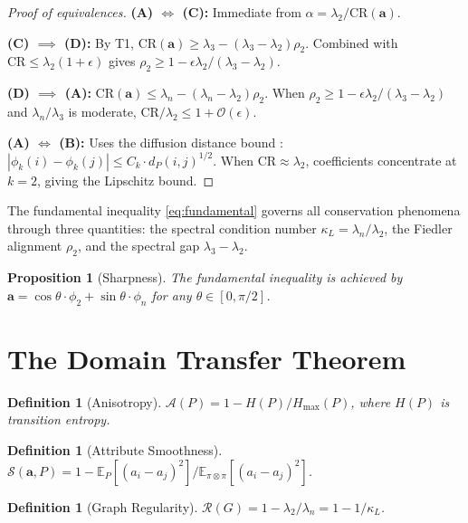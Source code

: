 \documentclass[12pt,letterpaper]{article}
\newtheorem{proposition}[theorem]{Proposition}
\newtheorem{definition}[theorem]{Definition}
\newcommand{\E}{\mathbb{E}}
\newcommand{\bfa}{\mathbf{a}}
\newcommand{\CR}{\mathrm{CR}}
\newcommand{\cA}{\mathcal{A}}
\newcommand{\cS}{\mathcal{S}}
\newcommand{\cR}{\mathcal{R}}
\newcommand{\cO}{\mathcal{O}}
\begin{document}
\begin{proof}[Proof of equivalences]
\textbf{(A) $\iff$ (C):} Immediate from $\alpha = \lambda_2/\CR(\bfa)$.

\textbf{(C) $\implies$ (D):} By T1, $\CR(\bfa) \geq \lambda_3 - (\lambda_3 - \lambda_2)\rho_2$. Combined with $\CR \leq \lambda_2(1+\epsilon)$ gives $\rho_2 \geq 1 - \epsilon\lambda_2/(\lambda_3 - \lambda_2)$.

\textbf{(D) $\implies$ (A):} $\CR(\bfa) \leq \lambda_n - (\lambda_n - \lambda_2)\rho_2$. When $\rho_2 \geq 1 - \epsilon\lambda_2/(\lambda_3 - \lambda_2)$ and $\lambda_n/\lambda_3$ is moderate, $\CR/\lambda_2 \leq 1 + \cO(\epsilon)$.

\textbf{(A) $\iff$ (B):} Uses the diffusion distance bound \citep{nadler2006}: $|\phi_k(i) - \phi_k(j)| \leq C_k \cdot d_P(i,j)^{1/2}$. When $\CR \approx \lambda_2$, coefficients concentrate at $k=2$, giving the Lipschitz bound.
\end{proof}

The fundamental inequality \eqref{eq:fundamental} governs all conservation phenomena through three quantities: the spectral condition number $\kappa_L = \lambda_n/\lambda_2$, the Fiedler alignment $\rho_2$, and the spectral gap $\lambda_3 - \lambda_2$.

\begin{proposition}[Sharpness]
\label{prop:sharpness}
The fundamental inequality is achieved by $\bfa = \cos\theta \cdot \phi_2 + \sin\theta \cdot \phi_n$ for any $\theta \in [0, \pi/2]$.
\end{proposition}

\section{The Domain Transfer Theorem}
\label{sec:transfer}

\begin{definition}[Anisotropy]
$\cA(P) = 1 - H(P)/H_{\max}(P)$, where $H(P)$ is transition entropy.
\end{definition}

\begin{definition}[Attribute Smoothness]
$\cS(\bfa, P) = 1 - \E_{P}[(a_i - a_j)^2] / \E_{\pi \otimes \pi}[(a_i - a_j)^2]$.
\end{definition}

\begin{definition}[Graph Regularity]
$\cR(G) = 1 - \lambda_2/\lambda_n = 1 - 1/\kappa_L$.
\end{definition}
\end{document}
